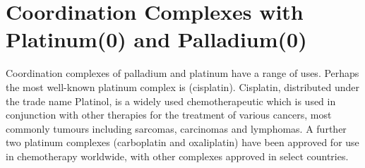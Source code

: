 
\chapter{Coordination Complexes with Platinum(0) and Palladium(0)}
\label{ch:platinum0}



Coordination complexes of palladium and platinum have a range of uses.  Perhaps the most well-known platinum complex is \ce{[PtCl2(NH3)2]} (cisplatin).  Cisplatin, distributed under the trade name Platinol, is a widely used chemotherapeutic which is used in conjunction with other therapies for the treatment of various cancers, most commonly tumours including sarcomas, carcinomas and lymphomas.\cite{Rosenberg1969, Wilson2013}  A further two platinum complexes (carboplatin and oxaliplatin) have been approved for use in chemotherapy worldwide, with other complexes approved in select countries.\cite{Pasqua2007, Wilson2013}

